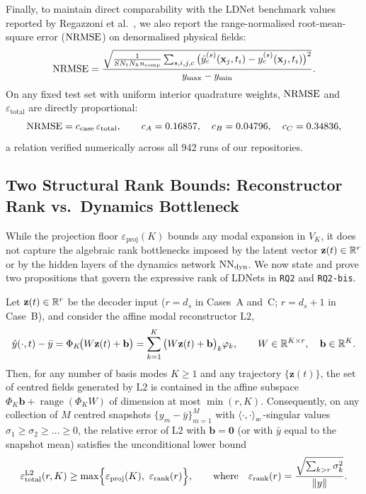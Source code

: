 Finally, to maintain direct comparability with the LDNet benchmark values reported by Regazzoni et al.~\cite{regazzoni2024learning}, we also report the range-normalised root-mean-square error ($\mathrm{NRMSE}$) on denormalised physical fields:
\begin{equation}
  \mathrm{NRMSE} = \frac{\sqrt{\frac{1}{S N_t N_h n_{\mathrm{comp}}}\sum_{s,i,j,c} \big(\hat{y}^{(s)}_c(\mathbf{x}_j,t_i) - y^{(s)}_c(\mathbf{x}_j,t_i)\big)^2}}{y_{\max} - y_{\min}}.
  \label{eq:nrmse_def}
\end{equation}
On any fixed test set with uniform interior quadrature weights, $\mathrm{NRMSE}$ and $\varepsilon_{\mathrm{total}}$ are directly proportional:
\begin{equation}
  \mathrm{NRMSE} = c_{\mathrm{case}}\,\varepsilon_{\mathrm{total}}, \qquad
  c_A = 0.16857, \quad c_B = 0.04796, \quad c_C = 0.34836,
  \label{eq:nrmse_proportionality}
\end{equation}
a relation verified numerically across all 942 runs of our repositories.

\subsection{Two Structural Rank Bounds: Reconstructor Rank vs.\ Dynamics Bottleneck}
\label{sec:rank_bounds}

While the projection floor $\varepsilon_{\mathrm{proj}}(K)$ bounds any modal expansion in $V_K$, it does not capture the algebraic rank bottlenecks imposed by the latent vector $\mathbf{z}(t) \in \mathbb{R}^r$ or by the hidden layers of the dynamics network $\mathrm{NN}_{\mathrm{dyn}}$. We now state and prove two propositions that govern the expressive rank of LDNets in \texttt{RQ2} and \texttt{RQ2-bis}.

\begin{proposition}
\label{prop:rec_rank_bound}
Let $\mathbf{z}(t) \in \mathbb{R}^r$ be the decoder input ($r = d_s$ in Cases~A and~C; $r = d_s + 1$ in Case~B), and consider the affine modal reconstructor $\mathrm{L2}$,
\[
  \hat{y}(\cdot,t) - \bar{y} = \Phi_K\!\big(W\mathbf{z}(t) + \mathbf{b}\big) = \sum_{k=1}^K \big(W\mathbf{z}(t) + \mathbf{b}\big)_k \varphi_k, \qquad W \in \mathbb{R}^{K \times r}, \quad \mathbf{b} \in \mathbb{R}^K.
\]
Then, for any number of basis modes $K \ge 1$ and any trajectory $\{\mathbf{z}(t)\}$, the set of centred fields generated by $\mathrm{L2}$ is contained in the affine subspace $\Phi_K\mathbf{b} + \operatorname{range}(\Phi_K W)$ of dimension at most $\min(r, K)$. Consequently, on any collection of $M$ centred snapshots $\{y_m - \bar{y}\}_{m=1}^M$ with $\left\langle \cdot, \cdot \right\rangle_w$-singular values $\sigma_1 \ge \sigma_2 \ge \dots \ge 0$, the relative error of $\mathrm{L2}$ with $\mathbf{b}=\mathbf{0}$ (or with $\bar{y}$ equal to the snapshot mean) satisfies the unconditional lower bound
\begin{equation}
  \varepsilon_{\mathrm{total}}^{\mathrm{L2}}(r, K) \ge \max\!\Big\{ \varepsilon_{\mathrm{proj}}(K),\ \varepsilon_{\mathrm{rank}}(r) \Big\}, \qquad
  \text{where}\quad \varepsilon_{\mathrm{rank}}(r) = \frac{\sqrt{\sum_{k > r} \sigma_k^2}}{\norm{y}}.
  \label{eq:rec_rank_bound}
\end{equation}
\end{proposition}

